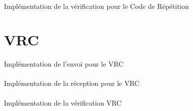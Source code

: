         \paragraph{}
Implémentation de la vérification pour le Code de Répétition

%
    \clearpage
%
%
%
    \section{VRC}
%
        \paragraph{}
Implémentation de l'envoi pour le VRC

    \clearpage
%
        \paragraph{}
Implémentation de la réception pour le VRC

    \clearpage
%
        \paragraph{}
Implémentation de la vérification VRC

%
    \clearpage
%

